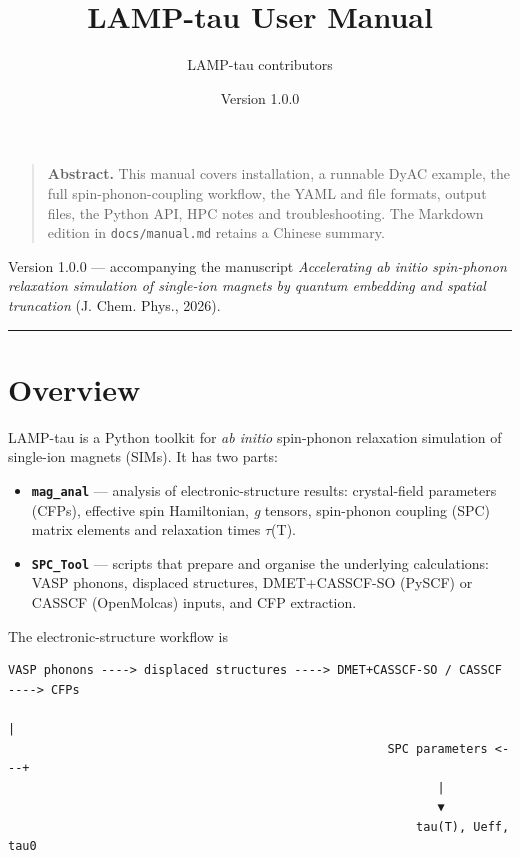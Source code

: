 \documentclass[11pt,a4paper]{article}
\title{LAMP-tau User Manual}
\author{LAMP-tau contributors}
\date{Version 1.0.0}
\providecommand{\tightlist}{%
  \setlength{\itemsep}{0pt}\setlength{\parskip}{0pt}}
\begin{document}
\maketitle
\tableofcontents
\newpage

\begin{quote}
\textbf{Abstract.} This manual covers installation, a runnable DyAC example, the full spin-phonon-coupling workflow, the YAML and file formats, output files, the Python API, HPC notes and troubleshooting. The Markdown edition in \texttt{docs/manual.md} retains a Chinese summary.
\end{quote}

Version 1.0.0 --- accompanying the manuscript \emph{Accelerating ab
initio spin-phonon relaxation simulation of single-ion magnets by
quantum embedding and spatial truncation} (J. Chem. Phys., 2026).

\begin{center}\rule{0.5\linewidth}{0.4pt}\end{center}

\section{Overview}\label{overview}

LAMP-tau is a Python toolkit for \emph{ab initio} spin-phonon relaxation
simulation of single-ion magnets (SIMs). It has two parts:

\begin{itemize}
\tightlist
\item
  \textbf{\texttt{mag\_anal}} --- analysis of electronic-structure
  results: crystal-field parameters (CFPs), effective spin Hamiltonian,
  \emph{g} tensors, spin-phonon coupling (SPC) matrix elements and
  relaxation times \(\tau\)(T).
\item
  \textbf{\texttt{SPC\_Tool}} --- scripts that prepare and organise the
  underlying calculations: VASP phonons, displaced structures,
  DMET+CASSCF-SO (PySCF) or CASSCF (OpenMolcas) inputs, and CFP
  extraction.
\end{itemize}

The electronic-structure workflow is

\begin{lstlisting}
VASP phonons ----> displaced structures ----> DMET+CASSCF-SO / CASSCF ----> CFPs
                                                                      |
                                                     SPC parameters <---+
                                                            |
                                                            ▼
                                                         tau(T), Ueff, tau0
\end{lstlisting}
\end{document}
